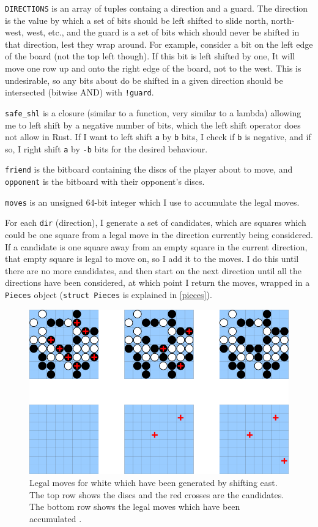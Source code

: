 \documentclass[12pt, a4paper]{report}
\begin{document}
\texttt{DIRECTIONS} is an array of tuples containg a direction and a guard. The direction is the value by which a set of bits should be left shifted to slide north, north-west, west, etc., and the guard is a set of bits which should never be shifted 
in that direction, lest they wrap around. For example, consider a bit on the left edge of the board (not the top left though). If this bit is left shifted by one, It will move one row up and onto the right edge of the board, not to the west.
This is undesirable, so any bits about do be shifted in a given direction should be intersected (bitwise AND) with \texttt{!guard}.

\texttt{safe\_shl} is a closure (similar to a function, very similar to a lambda) allowing me to left shift by a negative number of bits, which the left shift operator does not allow in Rust. If I want to left shift \texttt{a} by \texttt{b} bits, I check if \texttt{b} is negative, and 
if so, I right shift \texttt{a} by \texttt{-b} bits for the desired behaviour.

\texttt{friend} is the bitboard containing the discs of the player about to move, and \texttt{opponent} is the bitboard with their opponent's discs.

\texttt{moves} is an unsigned 64-bit integer which I use to accumulate the legal moves.

For each \texttt{dir} (direction), I generate a set of candidates, which are squares which could be one square from a legal move in the direction currently being considered. If a candidate is one square away from an empty square in the current 
direction, that empty square is legal to move on, so I add it to the moves. I do this until there are no more candidates, and then start on the next direction until all the directions have been considered, at which point I return the moves, wrapped 
in a \texttt{Pieces} object (\texttt{struct Pieces} is explained in \ref{pieces}).
\\

\begin{figure}[h]
	\centering
	\includegraphics[width=.75\textwidth]{bitmap}
	\caption{Legal moves for white which have been generated by shifting east. The top row shows the discs and the red crosses are the candidates. The bottom row shows the legal moves which have been accumulated .}
\end{figure}
\end{document}
